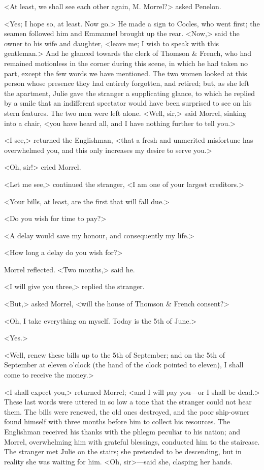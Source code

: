  <At least, we shall see each other again, M. Morrel?> asked Penelon. 

 <Yes; I hope so, at least. Now go.> He made a sign to Cocles, who went first; the seamen followed him and Emmanuel brought up the rear. <Now,> said the owner to his wife and daughter, <leave me; I wish to speak with this gentleman.>  And he glanced towards the clerk of Thomson \& French, who had remained motionless in the corner during this scene, in which he had taken no part, except the few words we have mentioned. The two women looked at this person whose presence they had entirely forgotten, and retired; but, as she left the apartment, Julie gave the stranger a supplicating glance, to which he replied by a smile that an indifferent spectator would have been surprised to see on his stern features. The two men were left alone. <Well, sir,> said Morrel, sinking into a chair, <you have heard all, and I have nothing further to tell you.> 

 <I see,> returned the Englishman, <that a fresh and unmerited misfortune has overwhelmed you, and this only increases my desire to serve you.> 

 <Oh, sir!> cried Morrel. 

 <Let me see,> continued the stranger, <I am one of your largest creditors.> 

 <Your bills, at least, are the first that will fall due.> 

 <Do you wish for time to pay?> 

 <A delay would save my honour, and consequently my life.> 

 <How long a delay do you wish for?> 

 Morrel reflected. <Two months,> said he. 

 <I will give you three,> replied the stranger. 

 <But,> asked Morrel, <will the house of Thomson \& French consent?> 

 <Oh, I take everything on myself. Today is the 5th of June.> 

 <Yes.> 

 <Well, renew these bills up to the 5th of September; and on the 5th of September at eleven o'clock (the hand of the clock pointed to eleven), I shall come to receive the money.> 

 <I shall expect you,> returned Morrel; <and I will pay you—or I shall be dead.> These last words were uttered in so low a tone that the stranger could not hear them. The bills were renewed, the old ones destroyed, and the poor ship-owner found himself with three months before him to collect his resources. The Englishman received his thanks with the phlegm peculiar to his nation; and Morrel, overwhelming him with grateful blessings, conducted him to the staircase. The stranger met Julie on the stairs; she pretended to be descending, but in reality she was waiting for him. <Oh, sir>—said she, clasping her hands. 

